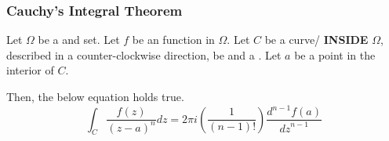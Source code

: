 \subsubsection{Cauchy's Integral Theorem}\label{subsubsec:Cauchys_Integral_Theorem}
\begin{theorem}\label{thm:Cauchys_Integral_Theorem}
  Let $\Omega$ be a  and  set.
  Let $f$ be an  function in $\Omega$.
  Let $C$ be a curve/ \textbf{INSIDE} $\Omega$, described in a counter-clockwise direction, be  and a .
  Let $a$ be a point in the interior of $C$.

  Then, the below equation holds true.
  \begin{equation}\label{eq:Cauchys_Integral_Theorem}
    \int_{C} \frac{f(z)}{{(z-a)}^{n}} dz = 2 \pi i \left( \frac{1}{(n-1)!} \right) \frac{ d^{n-1} f(a)}{{dz}^{n-1}}
  \end{equation}
\end{theorem}

